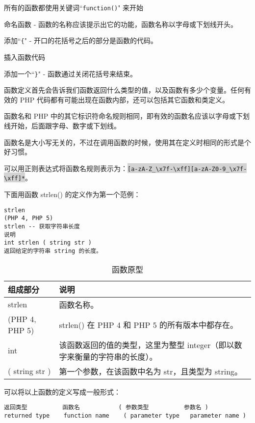 \begin{compactitem}
\item 所有的函数都使用关键词``\texttt{function()}" 来开始
\item 命名函数 - 函数的名称应该提示出它的功能，函数名称以字母或下划线开头。
\item 添加``\texttt{\{}" - 开口的花括号之后的部分是函数的代码。
\item 插入函数代码
\item 添加一个``\texttt{\}}" - 函数通过关闭花括号来结束。
\end{compactitem}

函数定义首先会告诉我们函数返回什么类型的值，以及函数有多少个变量。任何有效的 PHP 代码都有可能出现在函数内部，还可以包括其它函数和类定义。


函数名和 PHP 中的其它标识符命名规则相同，即有效的函数名应该以字母或下划线开始，后面跟字母、数字或下划线。

函数名是大小写无关的，不过在调用函数的时候，使用其在定义时相同的形式是个好习惯。

可以用正则表达式将函数名规则表示为：\colorbox{lightgray}{\texttt{[a-zA-Z\_\textbackslash x7f-\textbackslash xff][a-zA-Z0-9\_\textbackslash x7f-\textbackslash xff]*}}。

下面用函数 strlen() 的定义作为第一个范例：

\begin{verbatim}
strlen
(PHP 4, PHP 5)
strlen -- 获取字符串长度
说明
int strlen ( string str )
返回给定的字符串 string 的长度。
\end{verbatim}

\begin{table}
\centering
\caption{函数原型}
\begin{tabular}{|l|l|}
\hline
组成部分	&说明\\
\hline
strlen	 &函数名称。\\
\hline
(PHP 4, PHP 5)	& strlen() 在 PHP 4 和 PHP 5 的所有版本中都存在。\\
\hline
int	 &该函数返回的值的类型，这里为整型 integer（即以数字来衡量的字符串的长度）。\\
\hline
( string str )	 &第一个参数，在该函数中名为 str，且类型为 string。\\
\hline
\end{tabular}
\end{table}

可以将以上函数的定义写成一般形式：

\begin{verbatim}
返回类型          函数名           ( 参数类型          参数名 )
returned type    function name    ( parameter type   parameter name )
\end{verbatim}



